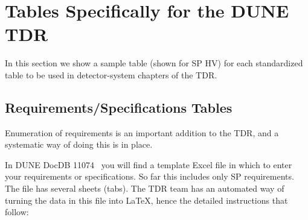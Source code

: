 \FloatBarrier

\section{Tables Specifically for the DUNE TDR}
\label{sec:tables}

In this section we show a sample table (shown for SP HV) for each standardized table to be used in detector-system chapters of the TDR. 

\subsection{Requirements/Specifications Tables}
\label{sec:tables-req}

Enumeration of requirements is an important addition to the TDR, and a systematic way of doing this is in place.  

In DUNE DocDB 11074~\cite{bib:docdb11074} you will find a template Excel file in which to enter your requirements or specifications.  So far this includes only SP requirements. The file has several sheets (tabs). The TDR team has an automated way of turning the data in this file into LaTeX, hence the detailed instructions that follow:

